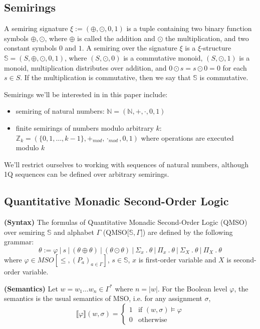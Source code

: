 \documentclass[12pt]{article}
\theoremstyle{definition}
\begin{document}
\subsection{Semirings}

A semiring signature $\xi := (\oplus, \odot, 0, 1)$ is a tuple containing two binary function symbols $\oplus, \odot$, where $\oplus$ is called the addition and $\odot$ the multiplication, and two constant symbols $0$ and $1$. A semiring over the signature $\xi$ is a $\xi$-structure $\mathbb{S} = (S, \oplus, \odot, 0, 1)$, where $(S, \odot, 0)$ is a commutative monoid, $(S, \odot, 1)$ is a monoid, multiplication distributes over addition, and $0 \odot s = s \odot 0 = 0$ for each $s \in S$. If the multiplication is commutative, then we say that $\mathbb{S}$ is commutative.

Semirings we'll be interested in in this paper include:

\begin{itemize}
    \item semiring of natural numbers: $\mathbb{N} = (\mathbb{N}, +, \cdot, 0, 1)$
    \item finite semirings of numbers modulo arbitrary $k$: $ \mathbb{Z}_k = (\{0,1,\ldots,k-1\}, +_{mod}, \cdot_{mod}, 0, 1)$ where operations are executed modulo $k$
\end{itemize}

We'll restrict ourselves to working with sequences of natural numbers, although 1Q sequences can be defined over arbitrary semirings.

\subsection{Quantitative Monadic Second-Order Logic}

\textbf{(Syntax)} The formulas of Quantitative Monadic Second-Order Logic (QMSO) over semiring $\mathbb{S}$ and alphabet $\Gamma$ (QMSO[$\mathbb{S}, \Gamma$]) are defined by the following grammar:
$$ \theta := \varphi \ | \ s \ | \ (\theta \oplus \theta) \ | \ (\theta \odot \theta) \ | \ \Sigma_x \ . \ \theta \ | \ \Pi_x \ . \ \theta \ | \ \Sigma_X \ . \ \theta \ | \ \Pi_X \ . \ \theta$$
where $\varphi \in MSO[\leq, (P_a)_{a \in \Gamma}]$, $s \in \mathbb{S}$, $x$ is first-order variable and $X$ is second-order variable.

\textbf{(Semantics)} Let $w 
= w_1 \dots w_n \in \Gamma^*$ where $n = |w|$. For the Boolean level $\varphi$, the semantics is the usual semantics of MSO, i.e. for any assignment $\sigma$,
\begin{equation*}
    \llbracket\varphi\rrbracket(w, \sigma) =
      \begin{cases}
        1 & \text{if $(w, \sigma) \models \varphi$}\\
        0 & \text{otherwise}
      \end{cases}       
\end{equation*}
\end{document}
